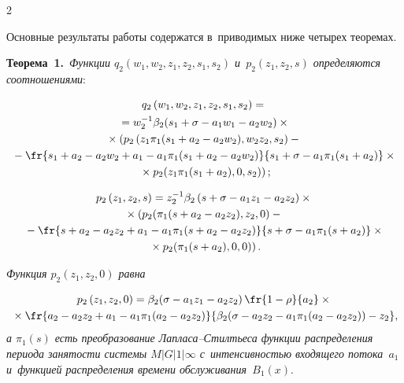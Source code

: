 \begin{multicols}{2}
\vspace*{-6pt}

Основные результаты работы содержатся в~приводимых ниже четырех теоремах.


\noindent
\textbf{Теорема~1.}\
\textit{Функции $q_2\left(w_1,w_2,z_1,z_2,s_1,s_2\right)$ 
и~$p_2\left(z_1,z_2,s\right)$  определяются соотношениями}:

\vspace*{-6pt}

\noindent
\begin{multline}
\label{n4}
q_2\left(w_1,w_2,z_1,z_2,s_1,s_2\right)={}\\
{}=
w_2^{-1}\beta_2(s_1+\sigma-a_1w_1-a_2w_2)\times{}\\
{}\times
\left(
\vphantom{\fr{s_1+a_2-a_2w_2+a_1-a_1\pi_1(s_1+a_2-a_2w_2)}{s_1+\sigma-a_1\pi_1(s_1+a_2)}}
p_2\left(z_1\pi_1(s_1+a_2-a_2w_2),w_2z_2,s_2\right)-{}\right.\\
{}-
\fr{s_1+a_2-a_2w_2+a_1-a_1\pi_1(s_1+a_2-a_2w_2)}{s_1+\sigma-a_1\pi_1(s_1+a_2)}\times{}\\
\left.{}\times
p_2(z_1\pi_1(s_1+a_2),0,s_2)
\vphantom{\fr{s_1+a_2-a_2w_2+a_1-a_1\pi_1(s_1+a_2-a_2w_2)}{s_1+\sigma-a_1\pi_1(s_1+a_2)}}
\right);
\end{multline}

\vspace*{-20pt}

\noindent
\begin{multline}
\label{n5}
p_2\left(z_1,z_2,s\right)=z_2^{-1}\beta_2\left(s+\sigma-a_1z_1-a_2z_2\right)
\times{}\\
{}\times
\left(
\vphantom{\fr{s_1+a_2-a_2w_2+a_1-a_1\pi_1(s_1+a_2-a_2w_2)}{s_1+\sigma-a_1\pi_1(s_1+a_2)}}
p_2(\pi_1(s+a_2-a_2z_2),z_2,0)-{}\right.\\
{}-
\fr{s+a_2-a_2z_2+a_1-a_1\pi_1(s+a_2-a_2z_2)}{s+\sigma-a_1\pi_1(s+a_2)}\times{}\\
\left.{}\times
p_2(\pi_1(s+a_2),0,0)
\vphantom{\fr{s_1+a_2-a_2w_2+a_1-a_1\pi_1(s_1+a_2-a_2w_2)}{s_1+\sigma-a_1\pi_1(s_1+a_2)}}
\right).
\end{multline}

\vspace*{-4pt}

\noindent
\textit{Функция $p_2\left(z_1,z_2,0\right)$ равна}

\vspace*{-9pt}

\noindent
\begin{multline}
\label{n6}
p_2\left(z_1,z_2,0\right)=\beta_2(\sigma-a_1z_1-a_2z_2)\,\fr{1-\rho}{a_2}
\times{}\\
{}\times \fr{a_2-a_2z_2+a_1-a_1\pi_1(a_2-a_2z_2)}{\beta_2(\sigma-a_2z_2-a_1\pi_1(a_2-a_2z_2))-z_2},
\end{multline}
\textit{а $\pi_1(s)$  есть преобразование Лап\-ла\-са--Стилть\-еса функции распределения периода занятости системы $M|G|1|\infty$ с~интенсивностью входящего
потока~$a_1$ и~функцией распределения времени обслуживания~$B_1(x).$}



\end{multicols}
